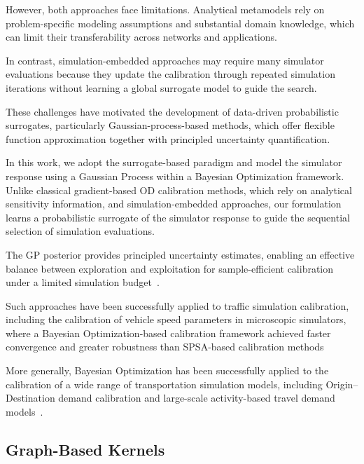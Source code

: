 \documentclass[11pt]{article}
\begin{document}
However, both approaches face limitations. Analytical metamodels rely on
problem-specific modeling assumptions and substantial domain knowledge, which
can limit their transferability across networks and applications. 

In contrast, simulation-embedded approaches may require many simulator evaluations because they update the calibration through repeated simulation iterations without learning a global surrogate model to guide the search.


These challenges have motivated the development of data-driven probabilistic
surrogates, particularly Gaussian-process-based methods, which offer flexible
function approximation together with principled uncertainty quantification.


In this work, we adopt the surrogate-based paradigm and model the simulator response using a Gaussian Process within a Bayesian Optimization framework. Unlike classical gradient-based OD calibration methods, which rely on analytical sensitivity information, and simulation-embedded approaches, our formulation learns a probabilistic surrogate of the simulator response to guide the sequential selection of simulation evaluations. 

The GP posterior provides principled uncertainty estimates, enabling an effective balance between exploration and exploitation for sample-efficient calibration under a limited simulation budget~\parencite{snoek2012practical,frazier2018tutorial}.


Such approaches have been successfully applied to traffic simulation calibration, including the calibration of vehicle speed parameters in microscopic simulators, where a Bayesian Optimization-based calibration framework achieved faster convergence and greater robustness than SPSA-based calibration methods~\parencite{shi2025traffic}

More generally, Bayesian Optimization has been successfully applied to the calibration of a wide range of transportation simulation models, including Origin--Destination demand calibration and large-scale activity-based travel demand models~\parencite{schultz2018bayesian,agriesti2023bayesian}.







\subsection{Graph-Based Kernels}
\label{sec:litreview_graphkernels}
\end{document}
